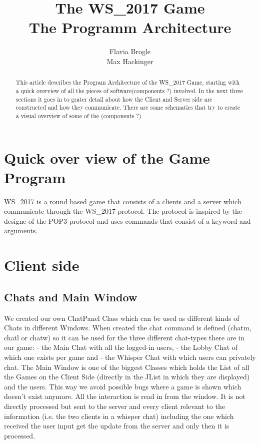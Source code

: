 \documentclass[11pt,a4paper]{article}
\title{The WS\_2017 Game \\ The Programm Architecture}
\author{Flavia Brogle \\ Max Hackinger}
\begin{document}
	\maketitle
  \tableofcontents
  
\begin{abstract}
  This article describes the Program Architecture of the WS\_2017 Game, starting with a quick overview of all the pieces of software(components ?) involved. In the next three sections it goes in to grater detail about how the Client and Server side are constructed and how they communicate. There are some schematics that try to create a visual overview of some of the (components ?) 
\end{abstract}  
  \clearpage
	\section{Quick over view of the Game Program}
	  WS\_2017 is a round based game that consists of a clients and a server which communicate through the WS\_2017 protocol. The protocol is inspired by the designe of the POP3 protocol and uses commands that consist of a keyword and arguments.
		\subsection{}
		\subsection{}
		\subsection{}
	\clearpage
	\section{Client side}
		\subsection{Chats and Main Window}
We created our own ChatPanel Class which can be used as different kinds of Chats in different Windows. When created the chat command is defined (chatm, chatl or chatw) so it can be used for the three different chat-types there are in our game:
- the Main Chat with all the logged-in users,
- the Lobby Chat of which one exists per game and
- the Whisper Chat with which users can privately chat.
The Main Window is one of the biggest Classes which holds the List of all the Games on the Client Side (directly in the JList in which they are displayed) and the users. This way we avoid possible bugs where a game is shown which doesn't exist anymore.
All the interaction is read in from the window. It is not directly processed but sent to the server and every client relevant to the information (i.e. the two clients in a whisper chat) including the one which received the user input get the update from the server and only then it is processed.
\end{document}
